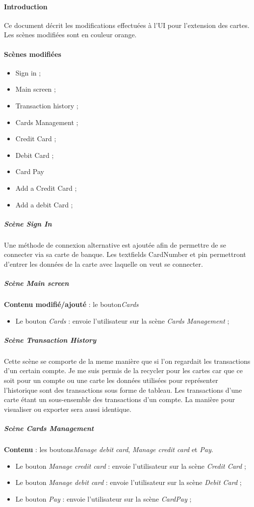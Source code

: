 \documentclass{article}
\newcommand{\navbutton}[2]{Le bouton \emph{#1} : envoie l'utilisateur sur la scène \emph{#2}}
\newcommand{\content}[1]{\textbf{Contenu} : #1}
\begin{document}
\paragraph{Introduction}
\noindent
Ce document décrit les modifications effectuées à l'UI pour l'extension des cartes.
Les scènes modifiées sont en couleur orange. \\

\paragraph{Scènes modifiées}
\begin{itemize}
\item Sign in ;
\item Main screen ;
\item Transaction history ;
\item Cards Management ;
\item Credit Card ;
\item Debit Card ;
\item Card Pay
\item Add a Credit Card ;
\item Add a debit Card ;
\end{itemize}

\subparagraph{Scène \emph{Sign In}}
Une méthode de connexion alternative est ajoutée afin de permettre de se connecter
via sa carte de banque. Les textfields CardNumber et pin permettront d'entrer les
données de la carte avec laquelle on veut se connecter.



\subparagraph{Scène \emph{Main screen}}

\textbf{Contenu modifié/ajouté} : le bouton\emph{Cards}
\begin{itemize}
\item \navbutton{Cards}{Cards Management} ;
\end{itemize}


\subparagraph{Scène \emph{Transaction History}}
Cette scène se comporte de la meme manière que si l'on regardait les transactions
d'un certain compte. Je me suis permis de la recycler pour les cartes car que ce
soit pour un compte ou une carte les données utilisées pour représenter l'historique
sont des transactions sous forme de tableau. Les transactions d'une carte étant un
sous-ensemble des transactions d'un compte. La manière pour visualiser ou exporter
sera aussi identique.  


\subparagraph{Scène \emph{Cards Management}}
\content{les boutons\emph{Manage debit card}, \emph{Manage credit card} et \emph{Pay}.}
\begin{itemize}
\item \navbutton{Manage credit card}{Credit Card} ;
\item \navbutton{Manage debit card}{Debit Card} ;
\item \navbutton{Pay}{CardPay} ;
\end{itemize}
\end{document}
